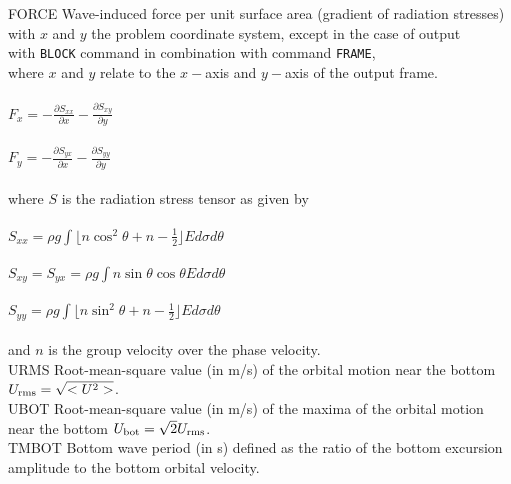 \documentclass[12pt]{book}
\begin{document}
\begin{tabbing}
FORCE                \> Wave-induced force per unit surface area (gradient of radiation stresses)\+\\
                        with $x$ and $y$ the problem coordinate system, except in the case of output\\
                        with {\tt BLOCK} command in
                        combination with command {\tt FRAME},\\
                        where $x$ and $y$ relate to the $x-$axis and $y-$axis of the output frame.\\
                        \\
$F_x = -\frac{\partial S_{xx}}{\partial x} - \frac{\partial S_{xy}}{\partial y}$ \\
                        \\
$F_y = -\frac{\partial S_{yx}}{\partial x} - \frac{\partial S_{yy}}{\partial y}$ \\
                        \\
                        where $S$ is the radiation stress tensor as given by\\
                        \\
$S_{xx} = \rho g \int \lfloor n \cos^2\theta + n - \frac{1}{2} \rfloor E d\sigma d\theta$ \\
                        \\
$S_{xy} = S_{yx} = \rho g \int n \sin\theta \cos\theta E d\sigma d\theta$ \\
                        \\
$S_{yy} = \rho g \int \lfloor n \sin^2\theta + n - \frac{1}{2} \rfloor E d\sigma d\theta$ \\
                        \\
                        and $n$ is the group velocity over the phase velocity.\-\\
URMS                 \> Root-mean-square value (in m/s) of the orbital motion near the bottom\+\\
                        $U_{\rm rms} = \sqrt{<U^2>}$.\-\\
UBOT                 \> Root-mean-square value (in m/s) of the maxima of the orbital motion\+\\
                        near the bottom $U_{\rm bot} = \sqrt{2} U_{\rm rms}$.\-\\
TMBOT                \> Bottom wave period (in s) defined as the ratio of the bottom excursion\+\\
                        amplitude to the bottom orbital velocity.\-\\

\end{tabbing}
\end{document}
